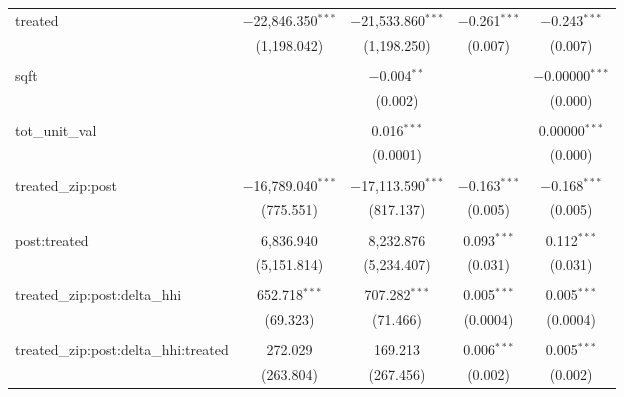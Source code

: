 \begin{table}[H]
{\begin{tabular}{@{\extracolsep{5pt}}lcccc}
  treated & $-$22,846.350$^{***}$ & $-$21,533.860$^{***}$ & $-$0.261$^{***}$ & $-$0.243$^{***}$ \\  

   & (1,198.042) & (1,198.250) & (0.007) & (0.007) \\  

   & & & & \\  

  sqft &  & $-$0.004$^{**}$ &  & $-$0.00000$^{***}$ \\  

   &  & (0.002) &  & (0.000) \\  

   & & & & \\  

  tot\_unit\_val &  & 0.016$^{***}$ &  & 0.00000$^{***}$ \\  

   &  & (0.0001) &  & (0.000) \\  

   & & & & \\  

  treated\_zip:post & $-$16,789.040$^{***}$ & $-$17,113.590$^{***}$ & $-$0.163$^{***}$ & $-$0.168$^{***}$ \\  

   & (775.551) & (817.137) & (0.005) & (0.005) \\  

   & & & & \\  

  post:treated & 6,836.940 & 8,232.876 & 0.093$^{***}$ & 0.112$^{***}$ \\  

   & (5,151.814) & (5,234.407) & (0.031) & (0.031) \\  

   & & & & \\  

  treated\_zip:post:delta\_hhi & 652.718$^{***}$ & 707.282$^{***}$ & 0.005$^{***}$ & 0.005$^{***}$ \\  

   & (69.323) & (71.466) & (0.0004) & (0.0004) \\  

   & & & & \\  

  treated\_zip:post:delta\_hhi:treated & 272.029 & 169.213 & 0.006$^{***}$ & 0.005$^{***}$ \\  

   & (263.804) & (267.456) & (0.002) & (0.002) \\  


\end{tabular}}
\end{table}
